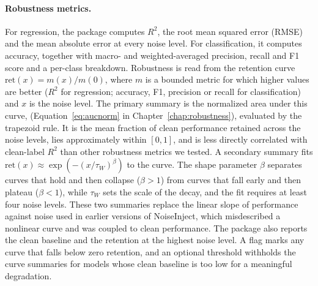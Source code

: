 \paragraph{Robustness metrics.} For regression, the package computes $R^2$, the root mean squared error (RMSE) and the mean absolute
error at every noise level. For classification, it computes accuracy, together with macro- and weighted-averaged precision, recall and F1
score and a per-class breakdown. Robustness is read from the
retention curve $\mathrm{ret}(x) = m(x)/m(0)$, where $m$ is a bounded metric for which higher values are better
($R^2$ for regression; accuracy, F1, precision or recall for classification) and $x$ is the noise
level. The primary summary is the normalized area under this curve, \aucnorm{} (Equation~\ref{eq:aucnorm} in Chapter~\ref{chap:robustness}),
evaluated by the trapezoid rule. It is the mean fraction of clean performance retained across the
noise levels, lies approximately within $[0, 1]$, and is less directly correlated with clean-label $R^2$ than other robustness metrics we tested. A
secondary summary fits $\mathrm{ret}(x) \approx \exp\!\left(-(x/\tau_W)^{\beta}\right)$ to the curve. The shape parameter
$\beta$ separates curves that hold and then collapse ($\beta > 1$) from curves that fall early and
then plateau ($\beta < 1$), while $\tau_W$ sets the scale of the decay, and the fit requires at least four
noise levels. These two summaries replace the linear slope of performance against noise used in
earlier versions of NoiseInject, which misdescribed a nonlinear curve and was coupled to clean performance. The
package also reports the clean baseline and the retention at the highest noise level. A flag marks any
curve that falls below zero retention, and an optional threshold withholds the curve summaries for
models whose clean baseline is too low for a meaningful degradation.

